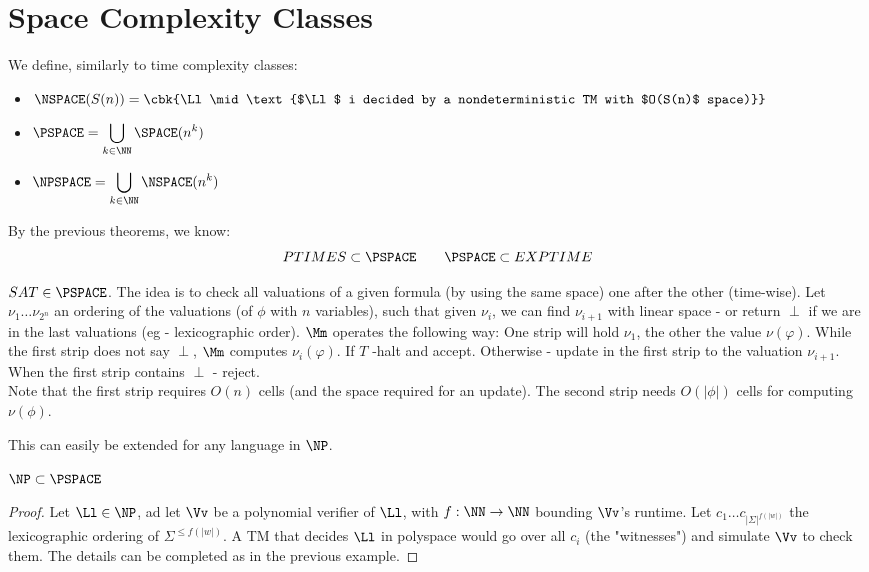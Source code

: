 \section{Space Complexity Classes}
\begin{yellowBox}
	\begin{defn}
		We define, similarly to time complexity classes:
		\begin{itemize}
			\item $\NSPACE(S(n)) = \cbk{\Ll\mid \text{$\Ll$ i decided by a nondeterministic TM with $O(S(n)$ space)}}$
			\item $\PSPACE = {\displaystyle \bigcup_{k\in \NN}\SPACE(n^k)}$
			\item $\NPSPACE = {\displaystyle \bigcup_{k\in \NN}\NSPACE(n^k)}$
		\end{itemize}
	\end{defn}
\end{yellowBox}
\begin{remark}
	By the previous theorems, we know:
	\[PTIMES\subset \PSPACE\qquad \PSPACE\subset EXPTIME\]
\end{remark}
\begin{example}
	$SAT\in \PSPACE$. The idea is to check all valuations of a given formula (by using the same space) one after the other (time-wise). Let $\nu_1\ldots \nu_{2^n}$ an ordering of the valuations (of $\phi$ with $n$ variables), such that given $\nu_i$, we can find $\nu_{i+1}$ with linear space - or return $\perp$ if we are in the last valuations (eg - lexicographic order). $\Mm$ operates the following way: One strip will hold $\nu_1$, the other the value $\nu(\varphi)$. While the first strip does not say $\perp$, $\Mm$ computes $\nu_i(\varphi)$. If $T$ -halt and accept. Otherwise - update in the first strip to the valuation $\nu_{i+1}$. When the first strip contains $\perp$ - reject.\\
	
	Note that the first strip requires $O(n)$ cells (and the space required for an update). The second strip needs $O(|\phi|)$ cells for computing $\nu(\phi)$.
	\end{example}
This can easily be extended for any language in $\NP$.
\begin{blueBox}
\begin{thm}
	$\NP\subset \PSPACE$
\end{thm}
\end{blueBox}
\begin{proof}
	Let $\Ll\in \NP$, ad let $\Vv$ be a polynomial verifier of $\Ll$, with $f:\NN\to \NN$ bounding  $\Vv$'s runtime. Let $c_1\ldots c_{|\Sigma|^{f(|w|)}}$ the lexicographic ordering of $\Sigma^{\leq f(|w|)}$. A TM that decides $\Ll$ in polyspace would go over all $c_i$ (the "witnesses") and simulate $\Vv$ to check them. The details can be completed as in the previous example.
\end{proof}
